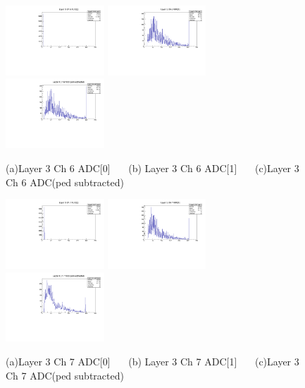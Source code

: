 \documentclass[a4paper,11pt]{article}
\theoremstyle{mytheor}
\begin{document}
\begin{figure}[H] 
\vspace*{-0.3cm} 
\includegraphics[width=0.33\textwidth,scale=0.5,trim=0 0 0 0,clip]{plotsdir/file0_muons-Layer3_Ch6_adc0-1.pdf} 
\includegraphics[width=0.33\textwidth,scale=0.5,trim=0 0 0 0,clip]{plotsdir/file0_muons-Layer3_Ch6_adc1-1.pdf} 
\includegraphics[width=0.33\textwidth,scale=0.5,trim=0 0 0 0,clip]{plotsdir/file0_muons-Layer3_Ch6_adcPedsub-1.pdf} 
\caption{(a)Layer 3 Ch 6 ADC[0] ~~~(b) Layer 3 Ch 6 ADC[1] ~~~(c)Layer 3 Ch 6 ADC(ped subtracted) } 
\end{figure} 
\begin{figure}[H] 
\vspace*{-0.3cm} 
\includegraphics[width=0.33\textwidth,scale=0.5,trim=0 0 0 0,clip]{plotsdir/file0_muons-Layer3_Ch7_adc0-1.pdf} 
\includegraphics[width=0.33\textwidth,scale=0.5,trim=0 0 0 0,clip]{plotsdir/file0_muons-Layer3_Ch7_adc1-1.pdf} 
\includegraphics[width=0.33\textwidth,scale=0.5,trim=0 0 0 0,clip]{plotsdir/file0_muons-Layer3_Ch7_adcPedsub-1.pdf} 
\caption{(a)Layer 3 Ch 7 ADC[0] ~~~(b) Layer 3 Ch 7 ADC[1] ~~~(c)Layer 3 Ch 7 ADC(ped subtracted) } 
\end{figure} 
\end{document}
